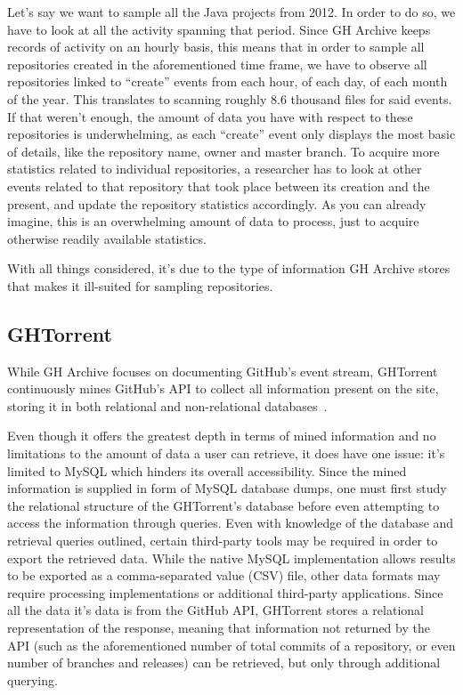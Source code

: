 Let's say we want to sample all the Java projects from 2012.
In order to do so, we have to look at all the activity spanning that period.
Since GH Archive keeps records of activity on an hourly basis, this means that in order to sample all repositories created in the aforementioned time frame, we have to observe all repositories linked to ``create'' events from each hour, of each day, of each month of the year.
This translates to scanning roughly 8.6 thousand files for said events.
If that weren't enough, the amount of data you have with respect to these repositories is underwhelming, as each ``create'' event only displays the most basic of details, like the repository name, owner and master branch.
To acquire more statistics related to individual repositories, a researcher has to look at other events related to that repository that took place between its creation and the present, and update the repository statistics accordingly.
As you can already imagine, this is an overwhelming amount of data to process, just to acquire otherwise readily available statistics.

With all things considered, it's due to the type of information GH Archive stores that makes it ill-suited for sampling repositories.

\subsection{GHTorrent}

While GH Archive focuses on documenting GitHub's event stream, GHTorrent continuously mines GitHub's API to collect all information present on the site, storing it in both relational and non-relational databases~\cite{G13}.

Even though it offers the greatest depth in terms of mined information and no limitations to the amount of data a user can retrieve, it does have one issue: it's limited to MySQL which hinders its overall accessibility.
Since the mined information is supplied in form of MySQL database dumps, one must first study the relational structure of the GHTorrent's database before even attempting to access the information through queries.
Even with knowledge of the database and retrieval queries outlined, certain third-party tools may be required in order to export the retrieved data.
While the native MySQL implementation allows results to be exported as a comma-separated value (CSV) file, other data formats may require processing implementations or additional third-party applications.
Since all the data it's data is from the GitHub API, GHTorrent stores a relational representation of the response, meaning that information not returned by the API (such as the aforementioned number of total commits of a repository, or even number of branches and releases) can be retrieved, but only through additional querying.
